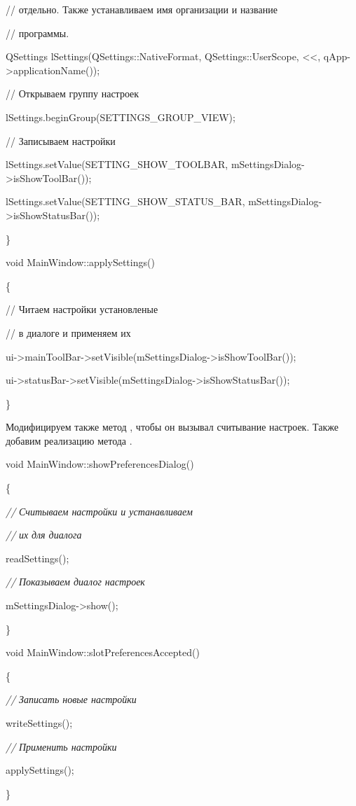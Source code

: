 // отдельно. Также устанавливаем имя организации и название

// программы.

QSettings lSettings(QSettings::NativeFormat, QSettings::UserScope, <<,
qApp-{>}applicationName());

// Открываем группу настроек 

lSettings.beginGroup(SETTINGS\_GROUP\_VIEW);

// Записываем настройки 

lSettings.setValue(SETTING\_SHOW\_TOOLBAR, mSettingsDialog-{>}isShowToolBar());

lSettings.setValue(SETTING\_SHOW\_STATUS\_BAR, mSettingsDialog-{>}isShowStatusBar());

\}

void MainWindow::applySettings()

\{

// Читаем настройки установленые

// в диалоге и применяем их 

ui-{>}mainToolBar-{>}setVisible(mSettingsDialog-{>}isShowToolBar());

ui-{>}statusBar-{>}setVisible(mSettingsDialog-{>}isShowStatusBar());

\}

Модифицируем также метод , чтобы он вызывал считывание настроек. Также добавим
реализацию метода . 

void MainWindow::showPreferencesDialog()

\{

\textit{//} \textit{Считываем настройки и устанавливаем}\textit{ }

\textit{//} \textit{их}\textit{ }\textit{для диалога }

 readSettings();

\textit{//} \textit{Показываем диалог настроек}\textit{ }

 mSettingsDialog-{>}show();

\}

void MainWindow::slotPreferencesAccepted()

\{

\textit{//} \textit{Записать новые настройки}\textit{ }

writeSettings();

\textit{//} \textit{П}\textit{рименить настройки}\textit{ }

applySettings();

\}

